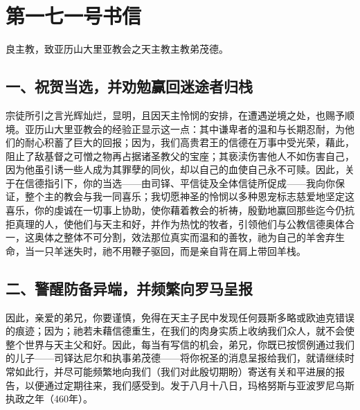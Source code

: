 

\section{第一七一号书信}

良主教，致亚历山大里亚教会之天主教主教弟茂德。\par


\subsection{一、祝贺当选，并劝勉赢回迷途者归栈}

宗徒所引之言光辉灿烂，显明，且因天主怜悯的安排，在遭遇逆境之处，也赐予顺境。亚历山大里亚教会的经验正显示这一点：其中谦卑者的温和与长期忍耐，为他们的耐心积蓄了巨大的回报；因为，我们高贵君王的信德在万事中受光荣，藉此，阻止了敌基督之可憎之物再占据诸圣教父的宝座；其亵渎伤害他人不如伤害自己，因为他虽引诱一些人成为其罪孽的同伙，却以自己的血使自己永不可赎。因此，关于在信德指引下，你的当选——由司铎、平信徒及全体信徒所促成——我向你保证，整个主的教会与我一同喜乐；我切愿神圣的怜悯以多种恩宠标志慈爱地坚定这喜乐，你的虔诚在一切事上协助，使你藉着教会的祈祷，殷勤地赢回那些迄今仍抗拒真理的人，使他们与天主和好，并作为热忱的牧者，引领他们与公教信德奥体合一，这奥体之整体不可分割，效法那位真实而温和的善牧，祂为自己的羊舍弃生命，当一只羊迷失时，祂不用鞭子驱回，而是亲自背在肩上带回羊栈。\par


\subsection{二、警醒防备异端，并频繁向罗马呈报}

因此，亲爱的弟兄，你要谨慎，免得在天主子民中发现任何聂斯多略或欧迪克错误的痕迹；因为；祂若未藉信德重生，在我们的肉身实质上收纳我们众人，就不会使整个世界与天主父和好。因此，每当有写信的机会，弟兄，你既已按惯例通过我们的儿子——司铎达尼尔和执事弟茂德——将你祝圣的消息呈报给我们，就请继续时常如此行，并尽可能频繁地向我们（我们对此殷切期盼）寄送有关和平进展的报告，以便通过定期往来，我们感受到。发于八月十八日，玛格努斯与亚波罗尼乌斯执政之年（460年）。\par

